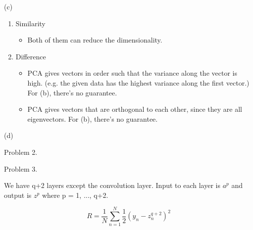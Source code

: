 \documentclass[11pt]{article}
\theoremstyle{definition}
\begin{document}
(c)
\begin{enumerate}
\item Similarity
\begin{itemize}
\item Both of them can reduce the dimensionality.
\end{itemize}

\item Difference
\begin{itemize}
\item PCA gives vectors in order such that the variance along the vector is high.
(e.g. the given data has the highest variance along the first vector.)
For (b), there's no guarantee.

\item PCA gives vectors that are orthogonal to each other, since they are all eigenvectors.
For (b), there's no guarantee.

\end{itemize}
\end{enumerate}

(d)

\pagebreak

Problem 2.

\bigskip

\pagebreak

Problem 3.

We have q+2 layers except the convolution layer. Input to each layer is $a^p$ and output is $z^p$ where p = 1, ..., q+2.

\begin{equation*}
R = \frac{1}{N} \sum_{n=1}^{N} \frac{1}{2} (y_n - z_n^{q+2})^2
\end{equation*}
\end{document}
